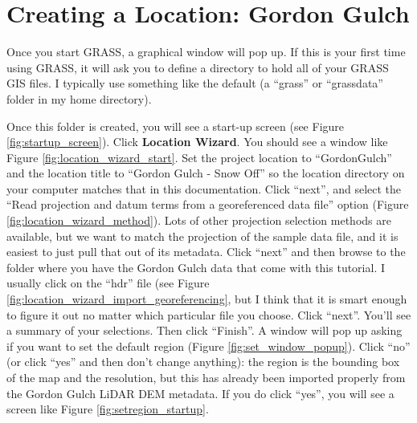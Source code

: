 \documentclass{book}
\begin{document}
\section{Creating a Location: Gordon Gulch \label{s:CreateLocation}}

Once you start GRASS, a graphical window will pop up. If this is your first time using GRASS, it will ask you to define a directory to hold all of your GRASS GIS files. I typically use something like the default (a ``grass'' or ``grassdata'' folder in my home directory).

Once this folder is created, you will see a start-up screen (see Figure \ref{fig:startup_screen}). Click {\bf Location Wizard}. You should see a window like Figure \ref{fig:location_wizard_start}. Set the project location to ``GordonGulch'' and the location title to ``Gordon Gulch - Snow Off'' so the location directory on your computer matches that in this documentation. Click ``next'', and select the ``Read projection and datum terms from a georeferenced data file'' option (Figure \ref{fig:location_wizard_method}). Lots of other projection selection methods are available, but we want to match the projection of the sample data file, and it is easiest to just pull that out of its metadata. Click ``next'' and then browse to the folder where you have the Gordon Gulch data that come with this tutorial. I usually click on the ``hdr'' file (see Figure \ref{fig:location_wizard_import_georeferencing}, but I think that it is smart enough to figure it out no matter which particular file you choose. Click ``next''. You'll see a summary of your selections. Then click ``Finish''. A window will pop up asking if you want to set the default region (Figure \ref{fig:set_window_popup}). Click ``no'' (or click ``yes'' and then don't change anything): the region is the bounding box of the map and the resolution, but this has already been imported properly from the Gordon Gulch LiDAR DEM metadata. If you do click ``yes'', you will see a screen like Figure \ref{fig:setregion_startup}.
\end{document}

